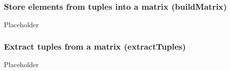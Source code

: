 \subsubsection{Store elements from tuples into a matrix ({\sf buildMatrix})}

Placeholder


\subsubsection{Extract tuples from a matrix ({\sf extractTuples})}

Placeholder


